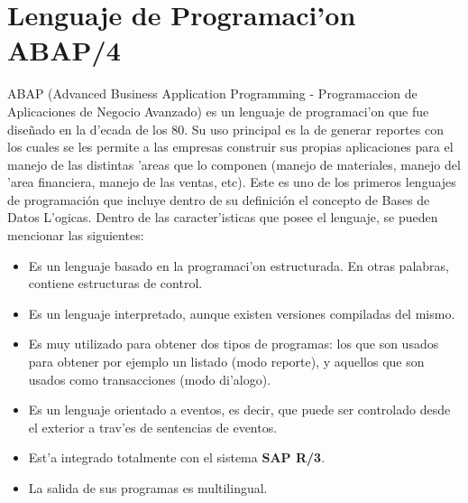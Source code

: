 \section{Lenguaje de Programaci'on ABAP/4}
ABAP (Advanced Business Application Programming - Programaccion de Aplicaciones de Negocio Avanzado) es un lenguaje de programaci'on que fue dise\~nado en la d'ecada de los 80. Su uso principal es la de generar reportes con los cuales se les permite a las empresas construir sus propias aplicaciones para el manejo de las distintas 'areas que lo componen (manejo de materiales, manejo del 'area financiera, manejo de las ventas, etc).
Este es uno de los primeros lenguajes de programación que incluye dentro de su definición el concepto de Bases de Datos L'ogicas. 
Dentro de las caracter'isticas que posee el lenguaje, se pueden mencionar las siguientes:
\begin{itemize}
\item Es un lenguaje basado en la programaci'on estructurada. En otras palabras, contiene estructuras de control.
\item Es un lenguaje interpretado, aunque existen versiones compiladas del mismo.
\item Es muy utilizado para obtener dos tipos de programas: los que son usados para obtener por ejemplo un listado (modo reporte), y aquellos que son usados como transacciones (modo di'alogo).
\item Es un lenguaje orientado a eventos, es decir, que puede ser controlado desde el exterior a trav'es de sentencias de eventos.
\item Est'a integrado totalmente con el sistema \textbf{SAP R/3}.
\item La salida de sus programas es multilingual. 
\end{itemize}
